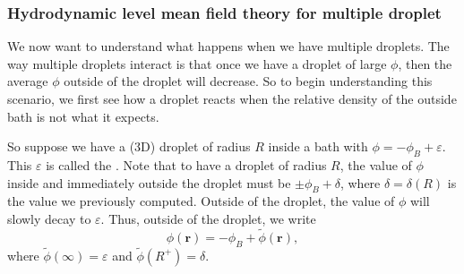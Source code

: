 \documentclass[a4paper]{article}
\begin{document}
\subsubsection*{Hydrodynamic level mean field theory for multiple droplet}
We now want to understand what happens when we have multiple droplets. The way multiple droplets interact is that once we have a droplet of large $\phi$, then the average $\phi$ outside of the droplet will decrease. So to begin understanding this scenario, we first see how a droplet reacts when the relative density of the outside bath is not what it expects.

So suppose we have a (3D) droplet of radius $R$ inside a bath with $\phi = - \phi_B + \varepsilon$. This $\varepsilon$ is called the . Note that to have a droplet of radius $R$, the value of $\phi$ inside and immediately outside the droplet must be $\pm \phi_B + \delta$, where $\delta = \delta(R)$ is the value we previously computed.
Outside of the droplet, the value of $\phi$ will slowly decay to $\varepsilon$. Thus, outside of the droplet, we write
\[
  \phi(\mathbf{r}) = -\phi_B+ \tilde{\phi}(\mathbf{r}),
\]
where $\tilde{\phi}(\infty) = \varepsilon$ and $\tilde{\phi}(R^+) = \delta$.
\end{document}
